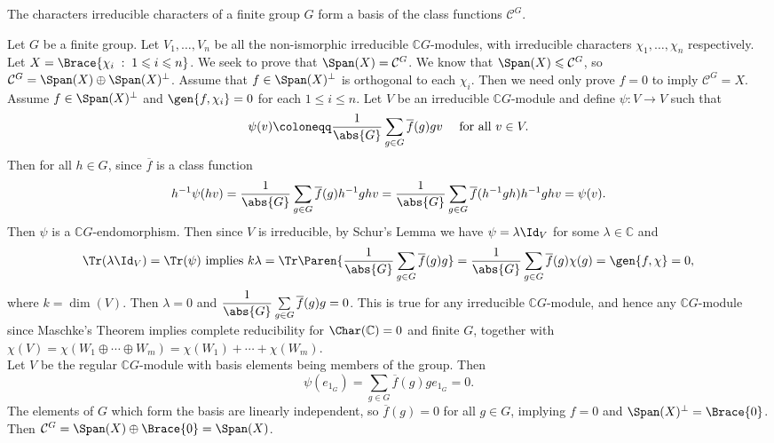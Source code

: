 \documentclass[../Project.tex]{subfiles}
\begin{document}
\begin{prop}[{\cite[page 24]{3}}]
\label{irrechararebasis}
	 The characters irreducible characters of a finite group $G$ form a basis of the class functions $\mathcal{C}^G$.
\end{prop}
\begin{proo*}[{\cite[page 31]{3}}]
	Let $G$ be a finite group. Let $V_1,\dots,V_n$ be all the non-ismorphic irreducible $\mathbb{C}G$-modules, with irreducible characters $\chi_1,\dots,\chi_n$ respectively.
	Let $X = \Brace{\chi_i \;:\; 1 \leqslant i \leqslant n}$. We seek to prove that $\Span(X) = \mathcal{C}^G$. We know that $\Span(X) \leqslant \mathcal{C}^G$, so $\mathcal{C}^G = \Span(X) \oplus \Span(X)^\perp$. Assume that $f \in \Span(X)^{\perp}$ is orthogonal to each $\chi_i$. Then we need only prove $f = 0$ to imply $\mathcal{C}^G = X$.\\
	
	Assume $f \in \Span(X)^\perp$ and $\gen{f,\chi_i} = 0$ for each $1 \leqslant i \leqslant n$. Let $V$  be an irreducible $\mathbb{C}G$-module and define
	$\psi : V \to V$ such that
	$$\psi(v) \coloneqq \frac{1}{\abs{G}}\sum_{g \in G}\overline{f}(g)gv \quad \text{ for all } v \in V.$$
	Then for all $h \in G$, since $\overline{f}$ is a class function
	$$h^{-1}\psi(hv) = \frac{1}{\abs{G}}\sum_{g \in G}\overline{f}(g)h^{-1}ghv = \frac{1}{\abs{G}}\sum_{g \in G}\overline{f}(h^{-1}gh)h^{-1}ghv = \psi(v).$$
	Then $\psi$ is a $\mathbb{C}G$-endomorphism. Then since $V$ is irreducible, by Schur's Lemma we have $\psi = \lambda\Id_V$ for some $\lambda \in \mathbb{C}$ and
	$$\Tr(\lambda\Id_V) = \Tr(\psi) \text{ implies } k\lambda = \Tr\Paren{\frac{1}{\abs{G}}\sum_{g \in G}\overline{f}(g)g} = \frac{1}{\abs{G}}\sum_{g \in G}\overline{f}(g)\chi(g) = \gen{f,\chi} = 0,$$
	where $k = \dim(V)$. Then $\lambda = 0$ and $\dfrac{1}{\abs{G}}\sum\limits_{g \in G}\overline{f}(g)g = 0$. This is true for any irreducible $\mathbb{C}G$-module, and hence any $\mathbb{C}G$-module since Maschke's Theorem implies complete reducibility for $\Char(\mathbb{C}) = 0$ and finite $G$, together with $\chi(V) = \chi(W_1 \oplus \cdots \oplus W_m) = \chi(W_1) + \cdots + \chi(W_m)$.\\

	Let $V$ be the regular $\mathbb{C}G$-module with basis elements being members of the group. Then
	$$\psi(e_{1_G}) = \sum_{g \in G}\overline{f}(g)ge_{1_G} = 0.$$
	The elements of $G$ which form the basis are linearly independent, so $\overline{f}(g) = 0$ for all $g \in G$, implying $f = 0$ and $\Span(X)^{\perp} = \Brace{0}$. Then $\mathcal{C}^G = \Span(X) \oplus \Brace{0} = \Span(X)$.
\end{proo*}
\end{document}
